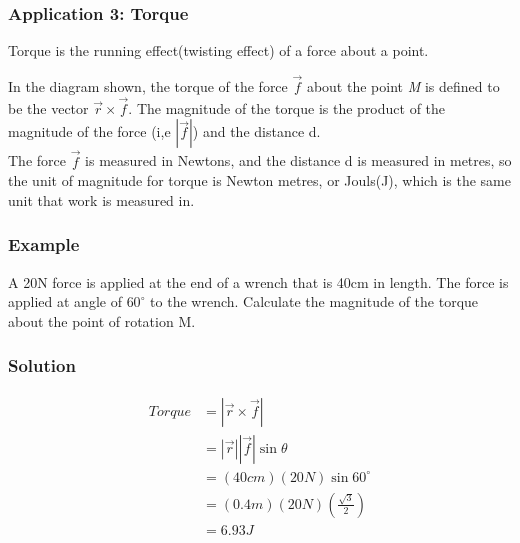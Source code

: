 \documentclass{article}
\begin{document}
 \subsubsection{Application 3: Torque}
 Torque is the running effect(twisting effect) of a force about a point.
 \begin{center}
 \end{center}

 In the diagram shown, the torque of the force $\vec{f}$ about the point \textit{M} is defined to be the vector $\vec{r} \times \vec{f}$. The magnitude of the torque is the product of the magnitude of the force (i,e $|\vec{f}|$) and the distance d.\\
 The force $\vec{f}$ is measured in Newtons, and the distance d is measured in metres, so the unit of magnitude for torque is Newton metres, or Jouls(J), which is the same unit that work is measured in.

 \subsubsection*{Example}
 A 20N force is applied at the end of a wrench that is 40cm in length. The force is applied at angle of $60^{\circ}$ to the wrench. Calculate the magnitude of the torque about the point of rotation M.

 \subsubsection*{Solution}
 \begin{align*}
     Torque &= |\vec{r}\times \vec{f}|\\
     &=|\vec{r}||\vec{f}| \sin \theta\\
     &=(40cm)(20N)\sin 60^{\circ}\\
     &=(0.4m)(20N)\left(\frac{\sqrt{3}}{2}\right)\\
     &=6.93 J
 \end{align*}
\end{document}

